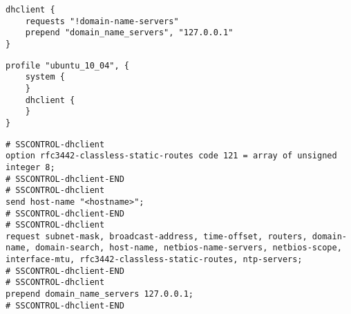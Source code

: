 
\begin{lstlisting}[style=Java,label=lst:dhclient_example_script,
title={Example script for the Dhclient service. It will remove the domain name servers from the DHCP request and use the DNS server on the localhost.}]
dhclient {
    requests "!domain-name-servers"
    prepend "domain_name_servers", "127.0.0.1"
}
\end{lstlisting}

\begin{lstlisting}[style=Java,label=lst:dhclient_ubuntu_profile_min,
title={Minimal Ubuntu Dhclient profile, all needed profile properties are already set to sensible default values.}]
profile "ubuntu_10_04", {
    system {
    }
    dhclient {
    }
}
\end{lstlisting}

\begin{lstlisting}[style=rcfile_nonumbers,
label=lst:dhclient_maincf_example,
title={Example of the DHCP configuration file that is created from the Dhclient profile.
The file is saved as /etc/dhcp3/dhclient.conf}]
# SSCONTROL-dhclient
option rfc3442-classless-static-routes code 121 = array of unsigned integer 8;
# SSCONTROL-dhclient-END
# SSCONTROL-dhclient
send host-name "<hostname>";
# SSCONTROL-dhclient-END
# SSCONTROL-dhclient
request subnet-mask, broadcast-address, time-offset, routers, domain-name, domain-search, host-name, netbios-name-servers, netbios-scope, interface-mtu, rfc3442-classless-static-routes, ntp-servers;
# SSCONTROL-dhclient-END
# SSCONTROL-dhclient
prepend domain_name_servers 127.0.0.1;
# SSCONTROL-dhclient-END
\end{lstlisting}

